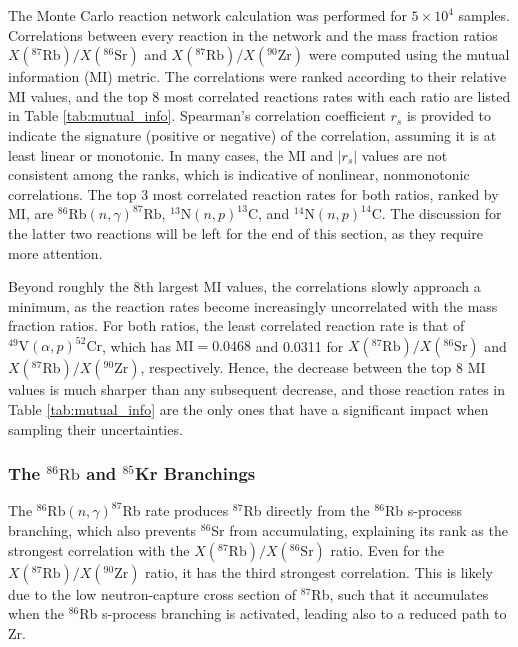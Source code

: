 The Monte Carlo reaction network calculation was performed for $5 \times 10^{4}$ samples. Correlations between every reaction in the network and the mass fraction ratios $X(^{87}\mathrm{Rb})/X(^{86}\mathrm{Sr})$ and $X(^{87}\mathrm{Rb})/X(^{90}\mathrm{Zr})$ were computed using the mutual information (MI) metric. The correlations were ranked according to their relative MI values, and the top 8 most correlated reactions rates with each ratio are listed in Table \ref{tab:mutual_info}. Spearman's correlation coefficient $r_{s}$ is provided to indicate the signature (positive or negative) of the correlation, assuming it is at least linear or monotonic. In many cases, the MI and $|r_{s}|$ values are not consistent among the ranks, which is indicative of nonlinear, nonmonotonic correlations. The top 3 most correlated reaction rates for both ratios, ranked by MI, are $^{86}\mathrm{Rb}(n,\gamma)^{87}\mathrm{Rb}$, $^{13}\mathrm{N}(n,p)^{13}\mathrm{C}$, and $^{14}\mathrm{N}(n,p)^{14}\mathrm{C}$. The discussion for the latter two reactions will be left for the end of this section, as they require more attention.

Beyond roughly the 8th largest MI values, the correlations slowly approach a minimum, as the reaction rates become increasingly uncorrelated with the mass fraction ratios. For both ratios, the least correlated reaction rate is that of $^{49}\mathrm{V}(\alpha,p)^{52}\mathrm{Cr}$, which has $\mathrm{MI} = 0.0468$ and 0.0311 for $X(^{87}\mathrm{Rb})/X(^{86}\mathrm{Sr})$ and $X(^{87}\mathrm{Rb})/X(^{90}\mathrm{Zr})$, respectively. Hence, the decrease between the top 8 MI values is much sharper than any subsequent decrease, and those reaction rates in Table \ref{tab:mutual_info} are the only ones that have a significant impact when sampling their uncertainties.

\subsubsection{The $^{86}\mathrm{Rb}$ and $^{85}$Kr Branchings}

The $^{86}\mathrm{Rb}(n,\gamma)^{87}\mathrm{Rb}$ rate produces $^{87}$Rb directly from the $^{86}$Rb s-process branching, which also prevents $^{86}$Sr from accumulating, explaining its rank as the strongest correlation with the $X(^{87}\mathrm{Rb})/X(^{86}\mathrm{Sr})$ ratio. Even for the $X(^{87}\mathrm{Rb})/X(^{90}\mathrm{Zr})$ ratio, it has the third strongest correlation. This is likely due to the low neutron-capture cross section of $^{87}$Rb, such that it accumulates when the $^{86}$Rb s-process branching is activated, leading also to a reduced path to Zr.

